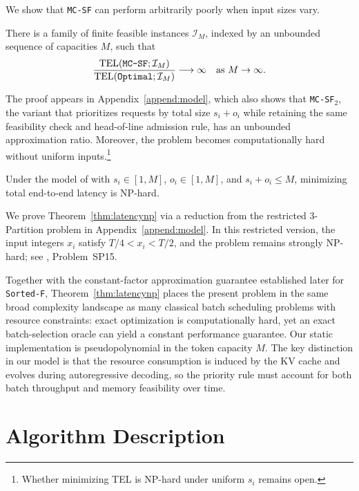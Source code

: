 \documentclass[nonblindrev]{informs3_hide}
\newcommand{\mcsdf}{\texttt{MC-SF}}
\newcommand{\mcsdff}{\texttt{MC-SF$_2$}}
\newcommand{\sortF}{\texttt{Sorted-F}}
\newcommand{\opt}{\texttt{Optimal}}
\begin{document}
We show that \mcsdf{} can perform arbitrarily poorly when input sizes vary.

\begin{theorem} \label{thm:benchmark}
There is a family of finite feasible instances $\mathcal I_M$, indexed by an unbounded sequence of capacities $M$, such that
\[
\frac{\mathrm{TEL}(\textup{\mcsdf};\mathcal I_M)}
     {\mathrm{TEL}(\textup{\opt};\mathcal I_M)}\longrightarrow\infty
\quad\text{as }M\to\infty.
\]
\end{theorem}

The proof appears in Appendix~\ref{append:model}, which also shows that \mcsdff{}, the variant that prioritizes requests by total size \(s_i + o_i\) while retaining the same feasibility check and head-of-line admission rule, has an unbounded approximation ratio. Moreover, the problem becomes computationally hard without uniform inputs.\footnote{Whether minimizing TEL is NP-hard under uniform \(s_i\) remains open.}

\begin{theorem} \label{thm:latencynp}
    Under the model of \cite{jaillet2025online} with \(s_i \in [1,M]\), \(o_i \in [1,M]\), and \(s_i + o_i \leq M\), minimizing total end-to-end latency is NP-hard.
\end{theorem}

We prove Theorem~\ref{thm:latencynp} via a reduction from the restricted 3-Partition problem in Appendix~\ref{append:model}. In this restricted version, the input integers \(x_i\) satisfy \(T/4 < x_i < T/2\), and the problem remains strongly NP-hard; see \cite{gareyjohnson1979}, Problem~SP15.

Together with the constant-factor approximation guarantee established later for \sortF{}, Theorem~\ref{thm:latencynp} places the present problem in the same broad complexity landscape as many classical batch scheduling problems with resource constraints: exact optimization is computationally hard, yet an exact batch-selection oracle can yield a constant performance guarantee. Our static implementation is pseudopolynomial in the token capacity $M$. The key distinction in our model is that the resource consumption is induced by the KV cache and evolves during autoregressive decoding, so the priority rule must account for both batch throughput and memory feasibility over time.


\section{Algorithm Description} \label{sec:algorithm}
\end{document}
